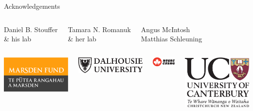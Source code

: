 \documentclass{beamer}
\begin{document}
  \begin{frame}{Acknowledgements}
    \begin{columns}
      \column{.25in}

      \column{1.5in}
      \centering

      Daniel B. Stouffer\\
      \& his lab
      
      \column{1.5in}
      \centering

      Tamara N. Romanuk\\
      \& her lab

      \column{1.5in}
      \centering

      Angus McIntosh\\
      Matthias Schleuning

      \column{.25in}
    \end{columns}

    \vspace{.5cm}

    \begin{columns}
    \column{.25in}
     \column{2.25in}
       \centering

      \includegraphics[height=.75in]{marsden-logo-cmyk-tif.eps}

      \vspace{.5cm}
      \vspace{.125in}

      \includegraphics[height=.5in]{Dal_logo.eps}

      \vspace{.125in}

     \column{2.25in}
       \centering

       \includegraphics[height=.75in]{NSERC_C.eps}

       \vspace{.5cm}

       \includegraphics[height=.75in]{logo-canterbury-color.eps} 

    \column{.25in}
    \end{columns}
  \end{frame}
\end{document}
